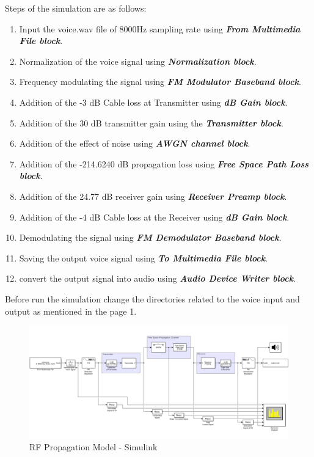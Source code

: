\documentclass[a4paper,11pt]{article}%
\begin{document}
Steps of the simulation are as follows:
\begin{enumerate}[1.]
	\item Input the voice.wav file of 8000Hz sampling rate using \textbf{\textit{From Multimedia File block}}.
	\item Normalization of the voice signal using \textbf{\textit{Normalization block}}.
	\item Frequency modulating the signal using \textbf{\textit{FM Modulator Baseband block}}.
	\item Addition of the -3 dB Cable loss at Transmitter using \textbf{\textit{dB Gain block}}.
	\item Addition of the 30 dB transmitter gain using the \textbf{\textit{Transmitter block}}.
	\item Addition of the effect of noise using \textbf{\textit{AWGN channel block}}.
	\item Addition of the -214.6240 dB propagation loss using \textbf{\textit{Free Space Path Loss block}}.
	\item Addition of the 24.77 dB receiver gain using  \textbf{\textit{Receiver Preamp block}}.
	\item Addition of the -4 dB Cable loss at the Receiver using \textbf{\textit{dB Gain block}}.
	\item Demodulating the signal using \textbf{\textit{FM Demodulator Baseband block}}.
	\item Saving the output voice signal using \textbf{\textit{To Multimedia File block}}.
	\item convert the output signal into audio using \textbf{\textit{Audio Device Writer block}}.
\end{enumerate}
\vspace{1cm}
Before run the simulation change the directories related to the voice input and output as mentioned in the page 1. 

	
\begin{figure}[!h]
	\centering
	\includegraphics[scale = 0.43 ]{figures/model} %
	\caption{RF Propagation Model - Simulink}
\end{figure}
\vspace{1.5cm}
\end{document}
